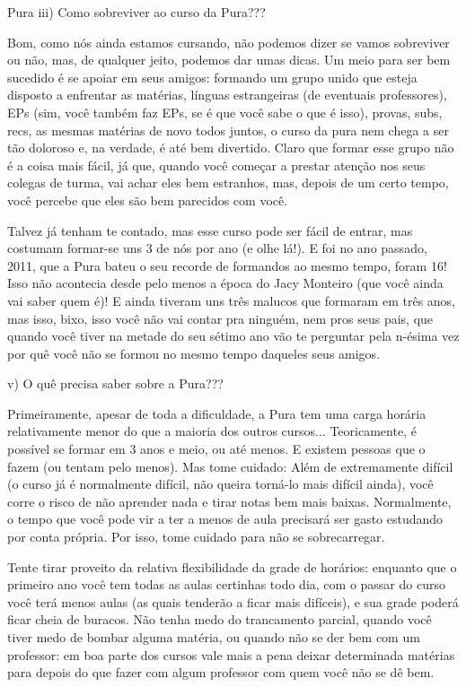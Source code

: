 \begin{subsecao}{Pura}
iii) Como sobreviver ao curso da Pura???

Bom, como nós ainda estamos cursando, não podemos dizer se vamos sobreviver ou
não, mas, de qualquer jeito, podemos dar umas dicas. Um meio para ser bem
sucedido é se apoiar em seus amigos: formando um grupo unido que esteja
disposto a enfrentar as matérias, línguas estrangeiras (de eventuais
professores), EPs (sim, você também faz EPs, se é que você sabe o que é isso),
provas, subs, recs, as mesmas matérias de novo todos juntos, o curso da pura
nem chega a ser tão doloroso e, na verdade, é até bem divertido. Claro que
formar esse grupo não é a coisa mais fácil, já que, quando você começar a
prestar atenção nos seus colegas de turma, vai achar eles bem estranhos, mas,
depois de um certo tempo, você percebe que eles são bem parecidos com você.

Talvez já tenham te contado, mas esse curso pode ser fácil de entrar, mas
costumam formar-se uns 3 de nós por ano (e olhe lá!). E foi no ano
passado, 2011, que a Pura bateu o seu recorde de formandos ao mesmo tempo,
foram 16! Isso não acontecia desde pelo menos a época do Jacy Monteiro (que
você ainda vai saber quem é)! E ainda tiveram uns três malucos que formaram em
três anos, mas isso, bixo, isso você não vai contar pra ninguém, nem pros seus
pais, que quando você tiver na metade do seu sétimo ano vão te perguntar pela
n-ésima vez por quê você não se formou no mesmo tempo daqueles seus amigos.

v) O quê precisa saber sobre a Pura???

Primeiramente, apesar de toda a dificuldade, a Pura tem uma carga horária
relativamente menor do que a maioria dos outros cursos... Teoricamente, é
possível se formar em 3 anos e meio, ou até menos. E existem pessoas que o
fazem (ou tentam pelo menos). Mas tome cuidado: Além de extremamente difícil (o
curso já é normalmente difícil, não queira torná-lo mais difícil ainda), você
corre o risco de não aprender nada e tirar notas bem mais baixas. Normalmente,
o tempo que você pode vir a ter a menos de aula precisará ser gasto estudando
por conta própria. Por isso, tome cuidado para não se sobrecarregar.

Tente tirar proveito da relativa flexibilidade da grade de horários: enquanto
que o primeiro ano você tem todas as aulas certinhas todo dia, com o passar do
curso você terá menos aulas (as quais tenderão a ficar mais difíceis), e sua
grade poderá ficar cheia de buracos. Não tenha medo do trancamento parcial,
quando você tiver medo de bombar alguma matéria, ou quando não se der bem com
um professor: em boa parte dos cursos vale mais a pena deixar determinada
matérias para depois do que fazer com algum professor com quem você não se dê
bem.


\end{subsecao}
